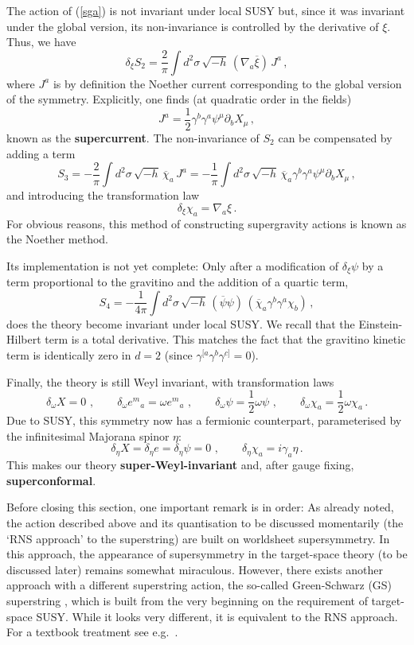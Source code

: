 \documentclass[12pt]{article}
\newcommand{\be}{\begin{equation}}
\newcommand{\ee}{\end{equation}}
\newcommand{\ol}{\overline}
\numberwithin{equation}{section}
\begin{document}
The action of (\ref{sga}) is not invariant under local SUSY but, since it was invariant under the global version, its non-invariance is controlled by the derivative of $\xi$. Thus, we have
\be
\delta_\xi S_2=\frac{2}{\pi} \int d^2\sigma\,\sqrt{-h}\,(\nabla_a\ol{\xi})\,J^a\,,
\ee
where $J^a$ is by definition the Noether current corresponding to the global version of the symmetry. Explicitly, one finds (at quadratic order in the fields) 
\be
J^a=\frac{1}{2}\gamma^b\gamma^a\psi^\mu\partial_b X_\mu\,,
\ee
known as the {\bf supercurrent}. The non-invariance of $S_2$ can be compensated by adding a term
\be
S_3=-\frac{2}{\pi}\int d^2\sigma\,\sqrt{-h}\,\ol{\chi}_a\, J^a 
=-\frac{1}{\pi}\int d^2\sigma\,\sqrt{-h}\,\ol{\chi}_a\gamma^b\gamma^a\psi^\mu \partial_bX_\mu\,,
\ee
and introducing the transformation law
\be
\delta_\xi\chi_a=\nabla_a\xi\,.
\ee
For obvious reasons, this method of constructing supergravity actions is known as the Noether method.

Its implementation is not yet complete: Only after a modification of $\delta_\xi \psi$ by a term proportional to the gravitino and the addition of a quartic term,
\be
S_4=-\frac{1}{4\pi}\int d^2\sigma\,\sqrt{-h}\,(\ol{\psi}\psi)\,(\ol{\chi}_a\gamma^b\gamma^a \chi_b)\,,
\ee
does the theory become invariant under local SUSY. We recall that the Einstein-Hilbert term is a total derivative. This matches the fact that the gravitino kinetic term is identically zero in $d=2$ (since $\gamma^{[a}\gamma^b\gamma^{c]}=0$).

Finally, the theory is still Weyl invariant, with transformation laws
\be
\delta_\omega X=0\,\,,\qquad \delta_\omega e^m{}_a=\omega e^m{}_a \,\,,\qquad \delta_\omega \psi=\frac{1}{2}\omega\psi\,\,,\qquad \delta_\omega \chi_a=\frac{1}{2}\omega\chi_a\,.
\ee
Due to SUSY, this symmetry now has a fermionic counterpart, parameterised by the infinitesimal Majorana spinor $\eta$:
\be
\delta_\eta X=\delta_\eta e =\delta_\eta \psi=0\,\,,\qquad \delta_\eta\chi_a=i\gamma_a\eta\,.
\ee
This makes our theory {\bf super-Weyl-invariant} and, after gauge fixing, {\bf superconformal}.

Before closing this section, one important remark is in order: As already noted, the action described above and its quantisation to be discussed momentarily (the `RNS approach' to the superstring) are built on worldsheet supersymmetry. In this approach, the appearance of supersymmetry in the target-space theory (to be discussed later) remains somewhat miraculous. However, there exists another approach with a different superstring action, the so-called Green-Schwarz (GS) superstring \cite{Green:1983wt, Schwarz:1982jn, Berkovits:2002zk}, which is built from the very beginning on the requirement of target-space SUSY. While it looks very different, it is equivalent to the RNS approach. For a textbook treatment see e.g.~\cite{bbs}.
\end{document}
